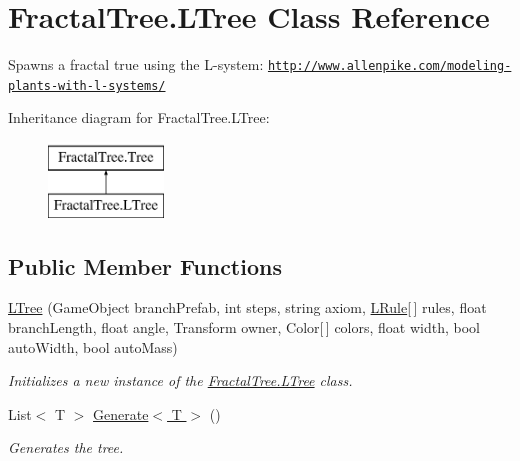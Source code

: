 \hypertarget{class_fractal_tree_1_1_l_tree}{}\section{Fractal\+Tree.\+L\+Tree Class Reference}
\label{class_fractal_tree_1_1_l_tree}


Spawns a fractal true using the L-\/system\+: \href{http://www.allenpike.com/modeling-plants-with-l-systems/}{\tt http\+://www.\+allenpike.\+com/modeling-\/plants-\/with-\/l-\/systems/}  


Inheritance diagram for Fractal\+Tree.\+L\+Tree\+:\begin{figure}[H]
\begin{center}
\leavevmode
\includegraphics[height=2.000000cm]{class_fractal_tree_1_1_l_tree}
\end{center}
\end{figure}
\subsection*{Public Member Functions}
\begin{DoxyCompactItemize}
\item 
\hyperlink{class_fractal_tree_1_1_l_tree_aac93139ff0e0b365ca88c2ff38ae1595}{L\+Tree} (Game\+Object branch\+Prefab, int steps, string axiom, \hyperlink{class_fractal_tree_1_1_l_rule}{L\+Rule}\mbox{[}$\,$\mbox{]} rules, float branch\+Length, float angle, Transform owner, Color\mbox{[}$\,$\mbox{]} colors, float width, bool auto\+Width, bool auto\+Mass)
\begin{DoxyCompactList}\small\item\em Initializes a new instance of the \hyperlink{class_fractal_tree_1_1_l_tree}{Fractal\+Tree.\+L\+Tree} class. \end{DoxyCompactList}\item 
List$<$ T $>$ \hyperlink{class_fractal_tree_1_1_l_tree_a36b2a48dbb01982a649f8949823464fc}{Generate$<$ T $>$} ()
\begin{DoxyCompactList}\small\item\em Generates the tree. \end{DoxyCompactList}\end{DoxyCompactItemize}


